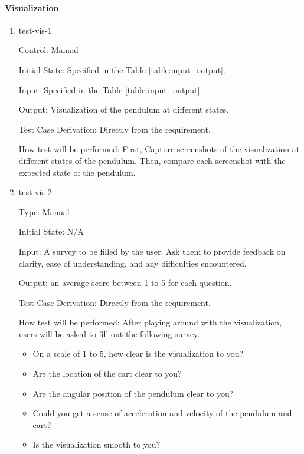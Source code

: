 \documentclass[12pt, titlepage]{article}
\begin{document}
		
\paragraph{Visualization}

\begin{enumerate}

\item{test-vis-1\\}

Control: Manual
					
Initial State: Specified in the \hyperref[table:input_output]{Table \ref*{table:input_output}}.
					
Input: Specified in the \hyperref[table:input_output]{Table \ref*{table:input_output}}.
					
Output: Visualization of the pendulum at different states.

Test Case Derivation: Directly from the requirement.
					
How test will be performed: First, Capture screenshots of the visualization 
at different states of the pendulum. Then, compare each screenshot with
the expected state of the pendulum.

\item{test-vis-2\\}

Type: Manual
					
Initial State: N/A
					
Input: A survey to be filled by the user. Ask them to provide feedback on clarity, 
ease of understanding, and any difficulties encountered.
					
Output: an average score between 1 to 5 for each question.

Test Case Derivation: Directly from the requirement.

How test will be performed: After playing around with the visualization, 
users will be asked to fill out the following survey.

\begin{itemize}\renewcommand{\labelitemi}{\scriptsize$\square$}
  \item On a scale of 1 to 5, how clear is the visualization to you?
  \item Are the location of the cart clear to you?
  \item Are the angular position of the pendulum clear to you?
  \item Could you get a sense of acceleration and velocity of the pendulum and cart?
  \item Is the visualization smooth to you?
\end{itemize}


\end{enumerate}
\end{document}
